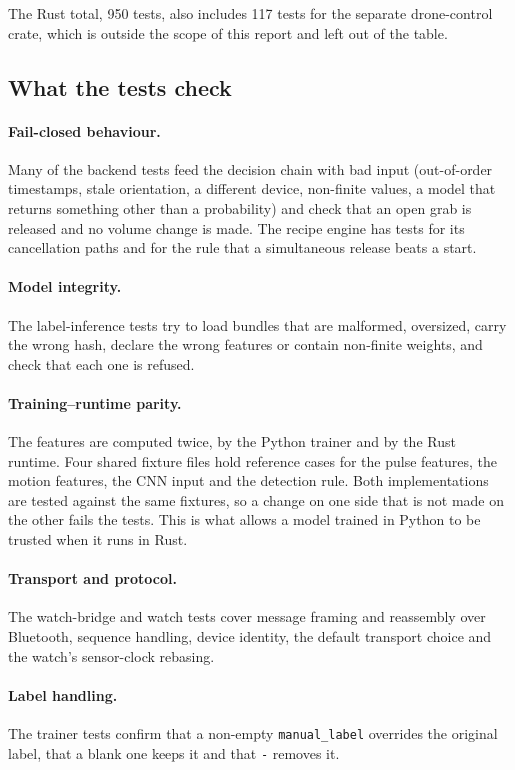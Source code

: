 The Rust total, 950 tests, also includes 117 tests for the separate drone-control crate, which is outside the scope of this report and left out of the table.

\subsection{What the tests check}

\paragraph{Fail-closed behaviour.} Many of the backend tests feed the decision chain with bad input (out-of-order timestamps, stale orientation, a different device, non-finite values, a model that returns something other than a probability) and check that an open grab is released and no volume change is made. The recipe engine has tests for its cancellation paths and for the rule that a simultaneous release beats a start.

\paragraph{Model integrity.} The label-inference tests try to load bundles that are malformed, oversized, carry the wrong hash, declare the wrong features or contain non-finite weights, and check that each one is refused.

\paragraph{Training--runtime parity.} The features are computed twice, by the Python trainer and by the Rust runtime. Four shared fixture files hold reference cases for the pulse features, the motion features, the CNN input and the detection rule. Both implementations are tested against the same fixtures, so a change on one side that is not made on the other fails the tests. This is what allows a model trained in Python to be trusted when it runs in Rust.

\paragraph{Transport and protocol.} The watch-bridge and watch tests cover message framing and reassembly over Bluetooth, sequence handling, device identity, the default transport choice and the watch's sensor-clock rebasing.

\paragraph{Label handling.} The trainer tests confirm that a non-empty \texttt{manual\_label} overrides the original label, that a blank one keeps it and that \texttt{-} removes it.

